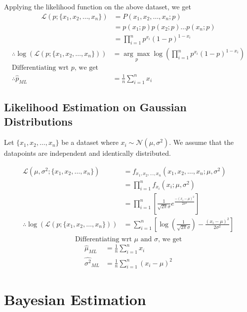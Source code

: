 \documentclass[
]{article}
\begin{document}
Applying the likelihood function on the above dataset, we get
\begin{align*}
\mathcal{L}(p;\{x_1, x_2, \ldots, x_n\}) &= P(x_1, x_2, \ldots, x_n;p)\\
&=p(x_1;p)p(x_2;p)\ldots p(x_n;p) \\
&=\prod _{i=1} ^n {p^{x_i}(1-p)^{1-x_i}}
\end{align*} \begin{align*}
\therefore \log(\mathcal{L}(p;\{x_1, x_2, \ldots, x_n\})) &=\underset{p} {\arg \max}\log \left ( \prod _{i=1} ^n {p^{x_i}(1-p)^{1-x_i}} \right ) \\
\text{Differentiating wrt $p$, we get}\\
\therefore \hat{p}_{ML} &= \frac{1}{n}\sum _{i=1} ^n x_i
\end{align*}

\hypertarget{likelihood-estimation-on-gaussian-distributions}{%
\subsection{Likelihood Estimation on Gaussian
Distributions}\label{likelihood-estimation-on-gaussian-distributions}}

Let \(\{x_1, x_2, \ldots, x_n\}\) be a dataset where
\(x_i \sim \mathcal{N}(\mu,\sigma^2)\). We assume that the datapoints
are independent and identically distributed.

\begin{align*}
\mathcal{L}(\mu, \sigma^2;\{x_1, x_2, \ldots, x_n\}) &= f_{x_1, x_2, \ldots, x_n}(x_1, x_2, \ldots, x_n;\mu, \sigma^2) \\
&=\prod _{i=1} ^n  f_{x_i}(x_i;\mu, \sigma^2) \\
&=\prod _{i=1} ^n \left [ \frac{1}{\sqrt{2\pi}\sigma} e^{\frac{-(x_i-\mu)^2}{2\sigma^2}} \right ] \\
\therefore \log(\mathcal{L}(p;\{x_1, x_2, \ldots, x_n\})) &= \sum _{i=1} ^n \left[ \log \left (\frac{1}{\sqrt{2\pi}\sigma}  \right ) - \frac{(x_i-\mu)^2}{2\sigma^2} \right] \\
\end{align*} \[
\text{Differentiating wrt $\mu$ and $\sigma$, we get}
\] \begin{align*}
\hat{\mu}_{ML} &= \frac{1}{n}\sum _{i=1} ^n x_i \\
\hat{\sigma^2}_{ML} &= \frac{1}{n}\sum _{i=1} ^n (x_i-\mu)^2
\end{align*}

\hypertarget{bayesian-estimation}{%
\section{Bayesian Estimation}\label{bayesian-estimation}}
\end{document}
